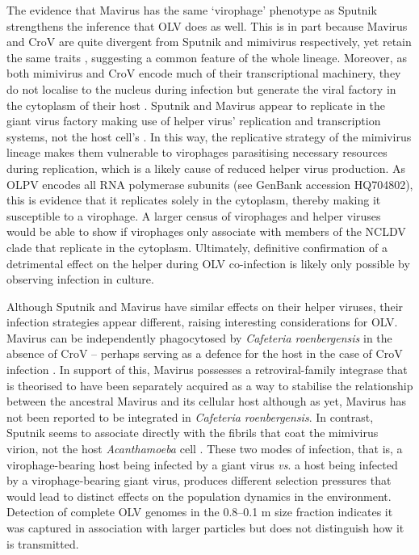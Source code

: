 The evidence that Mavirus has the same `virophage' phenotype as Sputnik strengthens the inference that \ac{OLV} does as well.
This is in part because Mavirus and \ac{CroV} are quite divergent from Sputnik and mimivirus respectively, yet retain the same traits \cite{Fischer2010, Fischer2011a}, suggesting a common feature of the whole lineage.
Moreover, as both mimivirus and \ac{CroV} encode much of their transcriptional machinery, they do not localise to the nucleus during infection but generate the viral factory in the cytoplasm of their host \cite{LaScola2008, Fischer2010}.
Sputnik and Mavirus appear to replicate in the giant virus factory making use of helper virus' replication and transcription systems, not the host cell's \cite{LaScola2008, Claverie2009, Fischer2011a}.
In this way, the replicative strategy of the mimivirus lineage makes them vulnerable to virophages parasitising necessary resources during replication, which is a likely cause of reduced helper virus production.
As \ac{OLPV} encodes all \textsc{RNA} polymerase subunits (see GenBank accession HQ704802), this is evidence that it replicates solely in the cytoplasm, thereby making it susceptible to a virophage.
A larger census of virophages and helper viruses would be able to show if virophages only associate with members of the \ac{NCLDV} clade that replicate in the cytoplasm.
Ultimately, definitive confirmation of a detrimental effect on the helper during \ac{OLV} co-infection is likely only possible by observing infection in culture.

Although Sputnik and Mavirus have similar effects on their helper viruses, their infection strategies appear different, raising interesting considerations for \ac{OLV}.
Mavirus can be independently phagocytosed by \emph{Cafeteria roenbergensis} in the absence of \ac{CroV} -- perhaps serving as a defence for the host in the case of \ac{CroV} infection \cite{Fischer2011a}.
In support of this, Mavirus possesses a retroviral-family integrase that is theorised to have been separately acquired as a way to stabilise the relationship between the ancestral Mavirus and its cellular host \cite{Fischer2011a} although as yet, Mavirus has not been reported to be integrated in \emph{Cafeteria roenbergensis}.
In contrast, Sputnik seems to associate directly with the fibrils that coat the mimivirus virion, not the host \emph{Acanthamoeba} cell \cite{Boyer2011}.
These two modes of infection, that is, a virophage-bearing host being infected by a giant virus \emph{vs}. a host being infected by a virophage-bearing giant virus, produces different selection pressures that would lead to distinct effects on the population dynamics in the environment.
Detection of complete \ac{OLV} genomes in the 0.8--0.1 \textmu{}m size fraction indicates it was captured in association with larger particles but does not distinguish how it is transmitted.

